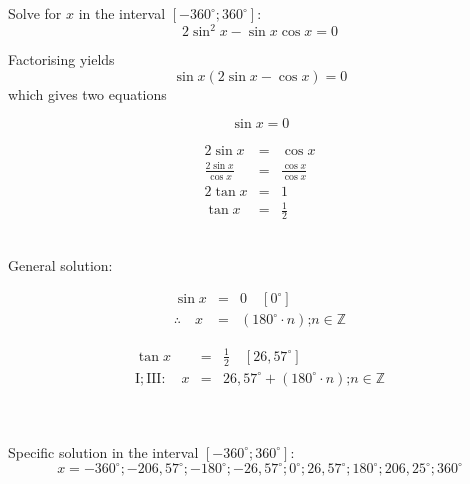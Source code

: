 \begin{wex}{}
{
Solve for $x$ in the interval $[-360^\circ;360^\circ]$:
\[2\sin^2x-\sin x \cos x = 0 \]
}%
{
Factorising yields
\[\sin x(2\sin x - \cos x) = 0\]
which gives two equations\\
\begin{minipage}{0.5\textwidth}
\[ \sin x = 0 \]
\[ \]
\[ \]
\[ \]
\end{minipage}
\begin{minipage}{0.5\textwidth}
\begin{eqnarray*}
2\sin x &=& \cos x \\
\frac{2\sin x}{\cos x} &=& \frac{\cos x}{\cos x} \\
2\tan x &=& 1 \\
\tan x &=& \tfrac{1}{2}
\end{eqnarray*}
\end{minipage}\\
General solution:\\
\begin{minipage}{0.5\textwidth}
\begin{eqnarray*}
 \sin x & = & 0 \quad [0^\circ]\\
\therefore \quad x &=& (180^\circ\cdot n)\mbox{;} n\in\mathbb{Z}
\end{eqnarray*}
\end{minipage}
\begin{minipage}{0.5\textwidth}
\begin{eqnarray*}
\tan x &=& \tfrac{1}{2} \quad [26,57^\circ]\\
\mathrm{I;III:} \quad x &=& 26,57^\circ +  (180^\circ\cdot n)\mbox{;} n\in\mathbb{Z} 
\end{eqnarray*}
\end{minipage}\\
\\
Specific solution in the interval  $[-360^\circ;360^\circ]$:
\[ x = -360^\circ; -206,57^\circ; -180^\circ; -26,57^\circ; 0^\circ; 26,57^\circ; 180^\circ; 206,25^\circ; 360^\circ \]
}%
\end{wex}

